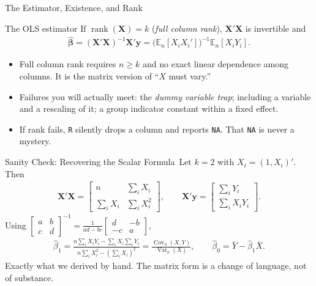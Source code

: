 \documentclass[aspectratio=169,11pt,xcolor=dvipsnames]{beamer}
\DeclareMathOperator{\Cov}{Cov}
\DeclareMathOperator{\Var}{Var}
\DeclareMathOperator{\rank}{rank}
\newcommand{\En}{\mathbb{E}_n}
\newcommand{\X}{\bm{X}}
\newcommand{\Y}{\bm{y}}
\newcommand{\bhat}{\hat{\bm{\beta}}}
\newcommand{\adv}{\,\raisebox{0.6pt}{\textcolor{accent}{$\bigstar$}}}
\begin{document}
\begin{frame}{The Estimator, Existence, and Rank}
\begin{block}{The OLS estimator}
If $\rank(\X)=k$ (\emph{full column rank}), $\X'\X$ is invertible and
\begin{align*}
  \bhat = (\X'\X)^{-1}\X'\Y = \big(\En[X_iX_i']\big)^{-1}\En[X_iY_i] .
\end{align*}
\end{block}
\begin{itemize}\itemsep3pt
  \item Full column rank requires $n \geq k$ and no exact linear dependence among
        columns. It is the matrix version of ``$X$ must vary.''
  \item Failures you will actually meet: the \emph{dummy variable trap}; including
        a variable and a rescaling of it; a group indicator constant within a
        fixed effect.
  \item If rank fails, \texttt{R} silently drops a column and reports \texttt{NA}.
        That \texttt{NA} is never a mystery.
\end{itemize}
\end{frame}

\begin{frame}{Sanity Check: Recovering the Scalar Formula\adv}
Let $k=2$ with $X_i = (1, X_i)'$. Then
\begin{align*}
  \X'\X = \begin{bmatrix} n & \sum_i X_i \\ \sum_i X_i & \sum_i X_i^2\end{bmatrix},
  \qquad
  \X'\Y = \begin{bmatrix} \sum_i Y_i \\ \sum_i X_i Y_i \end{bmatrix} .
\end{align*}
Using $\begin{bmatrix} a & b\\ c& d\end{bmatrix}^{-1}
= \frac{1}{ad-bc}\begin{bmatrix} d & -b\\ -c & a\end{bmatrix}$,
\begin{align*}
  \hat\beta_1 = \frac{n\sum_i X_iY_i - \sum_i X_i \sum_i Y_i}
                     {n\sum_i X_i^2 - (\sum_i X_i)^2}
  = \frac{\Cov_n(X,Y)}{\Var_n(X)},
  \qquad
  \hat\beta_0 = \bar Y - \hat\beta_1 \bar X .
\end{align*}
\vskip4pt
Exactly what we derived by hand. The matrix form is a change of language, not of
substance.
\end{frame}
\end{document}

